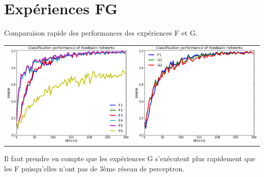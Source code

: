 \documentclass[a4paper,12pt]{article}
\begin{document}
  
  
  
  
  
  
  
  
  
  
  
  
  
  
  
  
  
  
  
  
  
  
  
  
  
  
  
  
  \section{Expériences FG}
  Comparaison rapide des performances des expériences F et G.
  \begin{center}
  \begin{tabular}{lr}
    \hspace*{-1cm}
    \includegraphics[width=250px]{data/expF.png}
    &
    \includegraphics[width=250px]{data/expG.png} 
  \end{tabular}
  \end{center}
  Il faut prendre en compte que les expériences G s'exécutent plus rapidement
  que les F puisqu'elles n'ont pas de 3ème réseau de perceptron.
  
  
\end{document}
